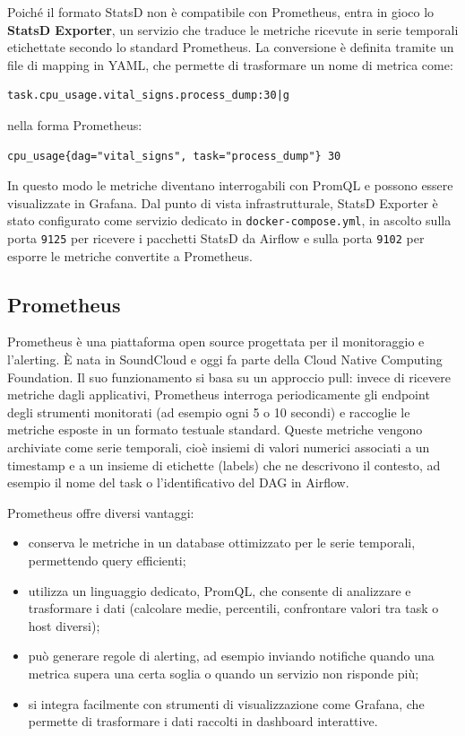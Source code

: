 Poiché il formato StatsD non è compatibile con Prometheus, entra in gioco lo \textbf{StatsD Exporter}, un servizio che traduce le metriche ricevute in serie temporali etichettate secondo lo standard Prometheus. La conversione è definita tramite un file di mapping in YAML, che permette di trasformare un nome di metrica come:

\begin{verbatim}
task.cpu_usage.vital_signs.process_dump:30|g
\end{verbatim}

nella forma Prometheus:

\begin{verbatim}
cpu_usage{dag="vital_signs", task="process_dump"} 30
\end{verbatim}

In questo modo le metriche diventano interrogabili con PromQL e possono essere visualizzate in Grafana. Dal punto di vista infrastrutturale, StatsD Exporter è stato configurato come servizio dedicato in \texttt{docker-compose.yml}, in ascolto sulla porta \texttt{9125} per ricevere i pacchetti StatsD da Airflow e sulla porta \texttt{9102} per esporre le metriche convertite a Prometheus.

\subsection{Prometheus}
\label{sec:prometheus}
Prometheus è una piattaforma open source progettata per il monitoraggio e l’alerting. È nata in SoundCloud e oggi fa parte della Cloud Native Computing Foundation.
Il suo funzionamento si basa su un approccio pull: invece di ricevere metriche dagli applicativi, Prometheus interroga periodicamente gli endpoint degli strumenti monitorati (ad esempio ogni 5 o 10 secondi) e raccoglie le metriche esposte in un formato testuale standard.
Queste metriche vengono archiviate come serie temporali, cioè insiemi di valori numerici associati a un timestamp e a un insieme di etichette (labels) che ne descrivono il contesto, ad esempio il nome del task o l’identificativo del DAG in Airflow.

Prometheus offre diversi vantaggi:
\begin{itemize}
    \item conserva le metriche in un database ottimizzato per le serie temporali, permettendo query efficienti;
    \item utilizza un linguaggio dedicato, PromQL, che consente di analizzare e trasformare i dati (calcolare medie, percentili, confrontare valori tra task o host diversi);
    \item può generare regole di alerting, ad esempio inviando notifiche quando una metrica supera una certa soglia o quando un servizio non risponde più;
    \item si integra facilmente con strumenti di visualizzazione come Grafana, che permette di trasformare i dati raccolti in dashboard interattive.
\end{itemize}

